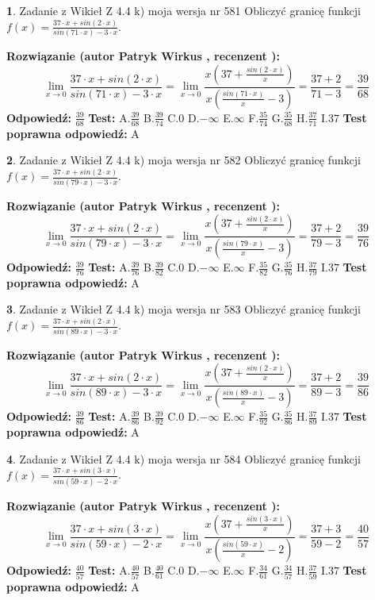 \documentclass[12pt, a4paper]{article}
\theoremstyle{definition} %
\newtheorem{zad}{}
\newcommand{\zadStart}[1]{\begin{zad}#1\newline}
\newcommand{\zadStop}{\end{zad}}
\newcommand{\rozwStart}[2]{\noindent \textbf{Rozwiązanie (autor #1 , recenzent #2): }\newline}
\newcommand{\rozwStop}{\newline}
\newcommand{\odpStart}{\noindent \textbf{Odpowiedź:}\newline}
\newcommand{\odpStop}{\newline}
\newcommand{\testStart}{\noindent \textbf{Test:}\newline}
\newcommand{\testStop}{\newline}
\newcommand{\kluczStart}{\noindent \textbf{Test poprawna odpowiedź:}\newline}
\newcommand{\kluczStop}{\newline}
\begin{document}
\zadStart{Zadanie z Wikieł Z 4.4 k) moja wersja nr 581}
Obliczyć granicę funkcji $f(x)=\frac{37\cdot x +sin(2\cdot x)}{sin(71\cdot x) -3\cdot x}$.
\zadStop
\rozwStart{Patryk Wirkus}{}
$$\lim\limits_{x\to 0}\frac{37\cdot x +sin(2\cdot x)}{sin(71\cdot x) -3\cdot x}
=\lim\limits_{x\to 0}\frac{x(37+\frac{sin(2\cdot x)}{x})}{x(\frac{sin(71\cdot x)}{x}-3)}
=\frac{37+2}{71-3} = \frac{39}{68}$$
\rozwStop
\odpStart
$\frac{39}{68}$
\odpStop
\testStart
A.$\frac{39}{68}$
B.$\frac{39}{74}$
C.$0$
D.$-\infty$
E.$\infty$
F.$\frac{35}{74}$
G.$\frac{35}{68}$
H.$\frac{37}{71}$
I.$37$
\testStop
\kluczStart
A
\kluczStop



\zadStart{Zadanie z Wikieł Z 4.4 k) moja wersja nr 582}
Obliczyć granicę funkcji $f(x)=\frac{37\cdot x +sin(2\cdot x)}{sin(79\cdot x) -3\cdot x}$.
\zadStop
\rozwStart{Patryk Wirkus}{}
$$\lim\limits_{x\to 0}\frac{37\cdot x +sin(2\cdot x)}{sin(79\cdot x) -3\cdot x}
=\lim\limits_{x\to 0}\frac{x(37+\frac{sin(2\cdot x)}{x})}{x(\frac{sin(79\cdot x)}{x}-3)}
=\frac{37+2}{79-3} = \frac{39}{76}$$
\rozwStop
\odpStart
$\frac{39}{76}$
\odpStop
\testStart
A.$\frac{39}{76}$
B.$\frac{39}{82}$
C.$0$
D.$-\infty$
E.$\infty$
F.$\frac{35}{82}$
G.$\frac{35}{76}$
H.$\frac{37}{79}$
I.$37$
\testStop
\kluczStart
A
\kluczStop



\zadStart{Zadanie z Wikieł Z 4.4 k) moja wersja nr 583}
Obliczyć granicę funkcji $f(x)=\frac{37\cdot x +sin(2\cdot x)}{sin(89\cdot x) -3\cdot x}$.
\zadStop
\rozwStart{Patryk Wirkus}{}
$$\lim\limits_{x\to 0}\frac{37\cdot x +sin(2\cdot x)}{sin(89\cdot x) -3\cdot x}
=\lim\limits_{x\to 0}\frac{x(37+\frac{sin(2\cdot x)}{x})}{x(\frac{sin(89\cdot x)}{x}-3)}
=\frac{37+2}{89-3} = \frac{39}{86}$$
\rozwStop
\odpStart
$\frac{39}{86}$
\odpStop
\testStart
A.$\frac{39}{86}$
B.$\frac{39}{92}$
C.$0$
D.$-\infty$
E.$\infty$
F.$\frac{35}{92}$
G.$\frac{35}{86}$
H.$\frac{37}{89}$
I.$37$
\testStop
\kluczStart
A
\kluczStop



\zadStart{Zadanie z Wikieł Z 4.4 k) moja wersja nr 584}
Obliczyć granicę funkcji $f(x)=\frac{37\cdot x +sin(3\cdot x)}{sin(59\cdot x) -2\cdot x}$.
\zadStop
\rozwStart{Patryk Wirkus}{}
$$\lim\limits_{x\to 0}\frac{37\cdot x +sin(3\cdot x)}{sin(59\cdot x) -2\cdot x}
=\lim\limits_{x\to 0}\frac{x(37+\frac{sin(3\cdot x)}{x})}{x(\frac{sin(59\cdot x)}{x}-2)}
=\frac{37+3}{59-2} = \frac{40}{57}$$
\rozwStop
\odpStart
$\frac{40}{57}$
\odpStop
\testStart
A.$\frac{40}{57}$
B.$\frac{40}{61}$
C.$0$
D.$-\infty$
E.$\infty$
F.$\frac{34}{61}$
G.$\frac{34}{57}$
H.$\frac{37}{59}$
I.$37$
\testStop
\kluczStart
A
\kluczStop
\end{document}
